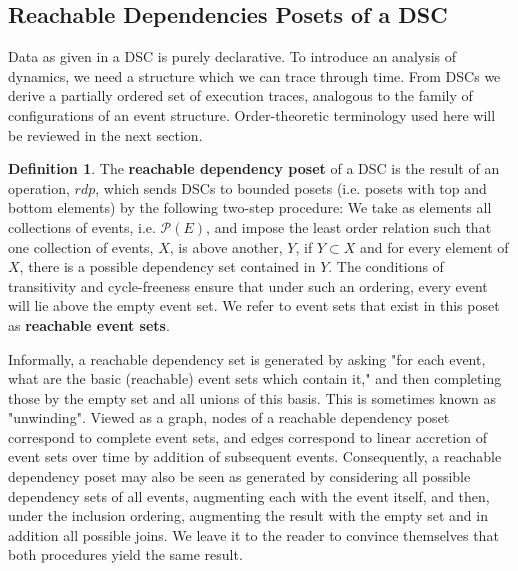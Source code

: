 \documentclass[hoptionsi,review,format=acmsmall]{acmart}
\theoremstyle{definition}
\newtheorem{definition}{Definition}[section]
\newcommand{\Pc}{\mathcal{P}}
\begin{document}
\subsection{Reachable Dependencies Posets of a DSC}

Data as given in a DSC is purely declarative. To introduce an analysis of dynamics, we need a structure which we can trace through time. From DSCs we derive a partially ordered set of execution traces, analogous to the family of configurations of an event structure. Order-theoretic terminology used here will be reviewed in the next section.

\begin{definition} The \textbf{reachable dependency poset} of a DSC is the result of an operation, \(rdp\), which sends DSCs to bounded posets (i.e. posets with top and bottom elements) by the following two-step procedure:  We take as elements all collections of events, i.e. \(\Pc(E)\), and impose the least order relation such that one collection of events, \(X\), is above another, \(Y\), if \(Y \subset X\) and for every element of \(X\), there is a possible dependency set contained in \(Y\).  The conditions of transitivity and cycle-freeness ensure that under such an ordering, every event will lie above the empty event set. We refer to event sets that exist in this poset as \textbf{reachable event sets}.
\end{definition}

Informally, a reachable dependency set is generated by asking "for each event, what are the basic (reachable) event sets which contain it," and then completing those by the empty set and all unions of this basis. This is sometimes known as "unwinding". Viewed as a graph, nodes of a reachable dependency poset correspond to complete event sets, and edges correspond to linear accretion of event sets over time by addition of subsequent events. Consequently, a reachable dependency poset may also be seen as generated by considering all possible dependency sets of all events, augmenting each with the event itself, and then, under the inclusion ordering, augmenting the result with the empty set and in addition all possible joins. We leave it to the reader to convince themselves that both procedures yield the same result.
\end{document}
